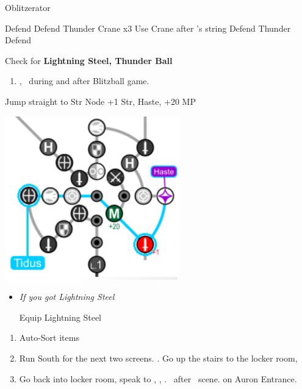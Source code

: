 \begin{battle}[3000]{Oblitzerator}
\begin{itemize}
	\kimahrif Defend
	\tidusf Defend
	\luluf Thunder Crane x3
	\tidusf Use Crane after \lulu's string
	\kimahrif Defend
	\luluf Thunder
	\tidusf Defend
\end{itemize}
Check for \textbf{Lightning Steel, Thunder Ball}
\end{battle}
\begin{enumerate}[resume]
	\item \cs[2:00], \sd\ during and after Blitzball game.
\end{enumerate}
\vfill
\begin{spheregrid}
	\begin{itemize}
		\tidusf Jump straight to Str Node
		\tidusf +1 Str, Haste, +20 MP
	\end{itemize}
	\includegraphics{graphics/haste}
\end{spheregrid}
\begin{equip}
	\begin{itemize}
		\item \textit{If you got Lightning Steel}
		\begin{itemize}
			\tidusf Equip Lightning Steel
		\end{itemize}
	\end{itemize}
\end{equip}
\begin{enumerate}[resume]
	\item Auto-Sort items
	\item Run South for the next two screens. \save. Go up the stairs to the locker room, \sd
	\item Go back into locker room, speak to \wakka, \sd, \cs[1:20]. \sd\ after \lulu\ scene. \cs[1:40] on Auron Entrance.
\end{enumerate}
